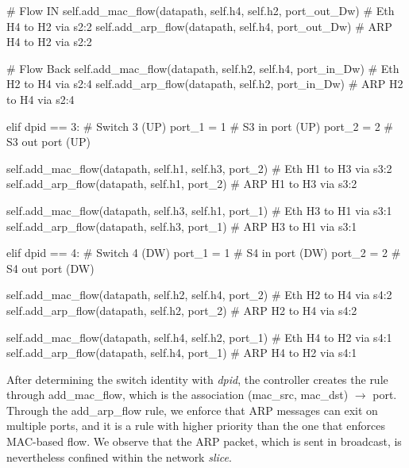 \begin{pythoncode}
        # Flow IN
        self.add_mac_flow(datapath, self.h4, self.h2, port_out_Dw) # Eth H4 to H2 via s2:2
        self.add_arp_flow(datapath, self.h4, port_out_Dw) # ARP H4 to H2 via s2:2

        # Flow Back
        self.add_mac_flow(datapath, self.h2, self.h4, port_in_Dw) # Eth H2 to H4 via s2:4
        self.add_arp_flow(datapath, self.h2, port_in_Dw) # ARP H2 to H4 via s2:4

    elif dpid == 3: # Switch 3 (UP)
        port_1 = 1 # S3 in port (UP)
        port_2 = 2 # S3 out port (UP)

        self.add_mac_flow(datapath, self.h1, self.h3, port_2) # Eth H1 to H3 via s3:2
        self.add_arp_flow(datapath, self.h1, port_2) # ARP H1 to H3 via s3:2

        self.add_mac_flow(datapath, self.h3, self.h1, port_1) # Eth H3 to H1 via s3:1
        self.add_arp_flow(datapath, self.h3, port_1) # ARP H3 to H1 via s3:1

    
    elif dpid == 4: # Switch 4 (DW)
        port_1 = 1 # S4 in port (DW)
        port_2 = 2 # S4 out port (DW)

        self.add_mac_flow(datapath, self.h2, self.h4, port_2) # Eth H2 to H4 via s4:2
        self.add_arp_flow(datapath, self.h2, port_2) # ARP H2 to H4 via s4:2

        self.add_mac_flow(datapath, self.h4, self.h2, port_1) # Eth H4 to H2 via s4:1
        self.add_arp_flow(datapath, self.h4, port_1) # ARP H4 to H2 via s4:1    
        
\end{pythoncode}

\noindent
After determining the switch identity with \textit{dpid}, the controller creates the rule through add\_mac\_flow, which is the association (mac\_src, mac\_dst) $\to$ port. Through the add\_arp\_flow rule, we enforce that ARP messages can exit on multiple ports, and it is a rule with higher priority than the one that enforces MAC-based flow. We observe that the ARP packet, which is sent in broadcast, is nevertheless confined within the network \textit{slice}.

